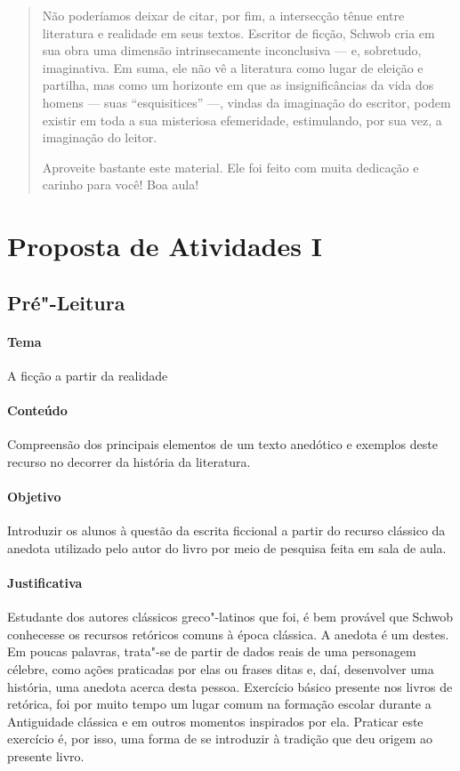 \documentclass[12pt]{extarticle}
\begin{document}
\begin{abstract}
Não poderíamos deixar de citar, por fim, a intersecção tênue entre literatura 
e realidade em seus textos. Escritor de ficção, Schwob cria em sua obra uma 
dimensão intrinsecamente inconclusiva --- e, sobretudo, imaginativa. Em suma, 
ele não vê a literatura como lugar de eleição e partilha, mas como um horizonte 
em que as insignificâncias da vida dos homens --- suas ``esquisitices'' ---, vindas 
da imaginação do escritor, podem existir em toda a sua misteriosa efemeridade, 
estimulando, por sua vez, a imaginação do leitor.

Aproveite bastante este material. Ele foi feito com muita dedicação e
carinho para você! Boa aula!

\end{abstract}

\tableofcontents


\section{Proposta de Atividades I}

\subsection{Pré"-Leitura}

 \paragraph{Tema} A ficção a partir da realidade

 \paragraph{Conteúdo} Compreensão dos principais elementos de um texto
 anedótico e exemplos deste recurso no decorrer da história da literatura.

 \paragraph{Objetivo} Introduzir os alunos à questão da escrita ficcional a partir
 do recurso clássico da anedota utilizado pelo autor do livro por meio de pesquisa
 feita em sala de aula.

 \paragraph{Justificativa} Estudante dos autores clássicos greco"-latinos que foi,
 é bem provável que Schwob conhecesse os recursos retóricos comuns à época clássica.
 A anedota é um destes. Em poucas palavras, trata"-se de partir de dados reais de 
 uma personagem célebre, como ações praticadas por elas ou frases ditas e, daí, 
 desenvolver uma história, uma anedota acerca desta pessoa. Exercício básico
 presente nos livros de retórica, foi por muito tempo um lugar comum 
 na formação escolar durante a Antiguidade clássica e em outros momentos inspirados por ela. 
 Praticar este exercício é, por isso, uma forma de se introduzir à tradição que deu origem ao
 presente livro.
\end{document}
